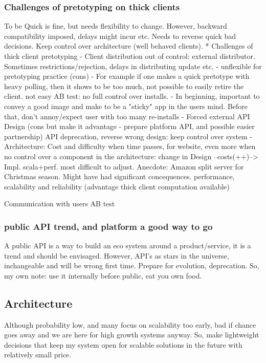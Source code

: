 \documentclass[a4paper,10pt]{book}
\begin{document}
\subsubsection{Challenges of pretotyping on thick clients}
To be Quick is fine, but needs flexibility to change. However, backward compatibility imposed, delays might incur etc.
Needs to reverse quick bad decisions. Keep control over architecture (well behaved clients).
 * Challenges of thick client pretotyping
 - Client distribution out of control: external distributor. Sometimes restrictions/rejection, delays in distributing update etc.
 - unflexible for pretotyping practice (cons)
    - For example if one makes a quick pretotype with heavy polling, then it shows to be too much, not possible to easily retire the client.
   not easy AB test: no full control over installs. 
 - In beginning, important to convey a good image and make to be a "sticky" app in the users mind. Before that, don't annoy/expect user
   with too many re-installs
 - Forced external API Design (cons but make it advantage - prepare platform API, and possible easier partnership)
    API deprecation, reverse wrong design: keep control over system
 - Architecture: 
    Cost and difficulty when time passes, for website, even more when no control over a component in the architecture:
      change in Design --costs(++)--> Impl.
      scala+perf. most difficult to adjust. Anecdote: Amazon split server for Christmas season. Might have had significant concequences.
    performance, scalability and reliability (advantage thick client computation available)


Communication with users
AB test

\subsubsection{public API trend, and platform a good way to go}
A public API is a way to build an eco system around a product/service, it is a trend and should be envisaged.
However, API's as stars in the universe, inchangeable and will be wrong first time.
Prepare for evolution, deprecation.
So, my own note: use it internally before public, eat you own food.

\subsection{Architecture}
Although probability low, and many focus on scalability too early, bad if chance goes away and we are here for high growth systems anyway.
So, make lightweight decisions that keep my system open for scalable solutions in the future with relatively small price.
\end{document}
